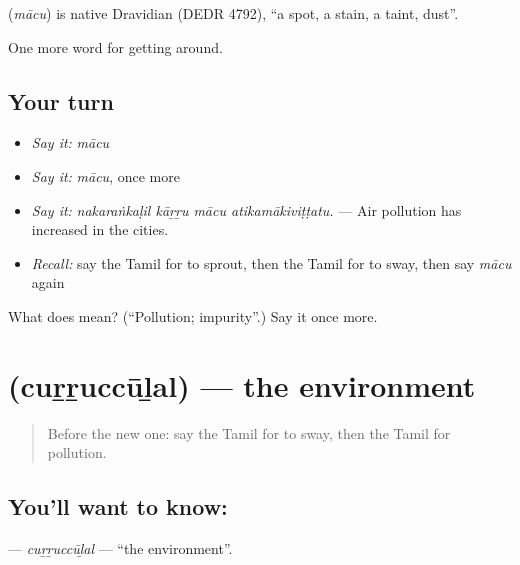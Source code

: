 \begin{cousinweb}
\textbf{} (\emph{mācu}) is native Dravidian (DEDR 4792), \textquotedblleft{}a spot, a stain, a taint, dust\textquotedblright{}.
\end{cousinweb}

\begin{grammarlens}[title={What you've built}]
One more word for getting around.
\end{grammarlens}

\subsection*{Your turn}
\begin{itemize}
\raggedright
  \item \emph{Say it:} \emph{mācu}
  \item \emph{Say it:} \emph{mācu}, once more
  \item \emph{Say it:} \emph{nakaraṅkaḷil kāṟṟu mācu atikamākiviṭṭatu.} — Air pollution has increased in the cities.
  \item \emph{Recall:} say the Tamil for to sprout, then the Tamil for to sway, then say \emph{mācu} again
\end{itemize}

\begin{tcolorbox}[breakable,colback=teal!4,colframe=teal!35!black,title={Before you move on}]
What does  mean? (\textquotedblleft{}Pollution; impurity\textquotedblright{}.) Say it once more.
\end{tcolorbox}
\section[\texorpdfstring{\ta{சுற்றுச்சூழல்} (cuṟṟuccūḻal)}{சுற்றுச்சூழல் (cuṟṟuccūḻal)}]{ (cuṟṟuccūḻal) — the environment}

\label{lesson:TA-C440-currucculal}



\begin{quote}
Before the new one: say the Tamil for to sway, then the Tamil for pollution.
\end{quote}

\subsection*{You'll want to know: }
\textbf{} — \emph{cuṟṟuccūḻal} — \textquotedblleft{}the environment\textquotedblright{}.

